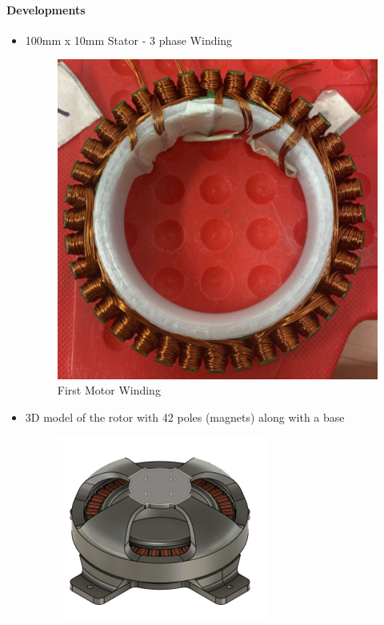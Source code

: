 \documentclass{article}
\begin{document}
\paragraph{Developments}
 \begin{itemize}
    \item 100mm x 10mm Stator - 3 phase Winding
    \begin{figure}[H]
        \centering
        \includegraphics[width=\linewidth]{Images/Motor/Estator10010PrimerEmbobinado.png}
        \caption{First Motor Winding}
    \end{figure}
    \item 3D model of the rotor with 42 poles (magnets) along with a base
    \begin{figure}[H]
        \centering
        \includegraphics[width=\linewidth]{Images/Motor/PrimerPrototipo.png}

\end{figure}
\end{itemize}
\end{document}
